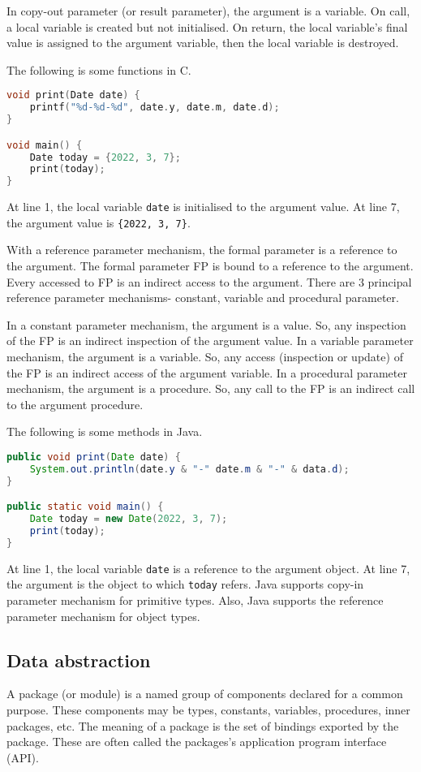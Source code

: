\documentclass[a4paper, openany]{memoir}
\begin{document}
In copy-out parameter (or result parameter), the argument is a variable. On call, a local variable is created but not initialised. On return, the local variable's final value is assigned to the argument variable, then the local variable is destroyed.

The following is some functions in C.
\begin{lstlisting}[language=C]
void print(Date date) {
    printf("%d-%d-%d", date.y, date.m, date.d);
}

void main() {
    Date today = {2022, 3, 7};
    print(today);
}
\end{lstlisting}
At line 1, the local variable \texttt{date} is initialised to the argument value. At line 7, the argument value is \texttt{\{2022, 3, 7\}}.

With a reference parameter mechanism, the formal parameter is a reference to the argument. The formal parameter FP is bound to a reference to the argument. Every accessed to FP is an indirect access to the argument. There are 3 principal reference parameter mechanisms- constant, variable and procedural parameter.

In a constant parameter mechanism, the argument is a value. So, any inspection of the FP is an indirect inspection of the argument value. In a variable parameter mechanism, the argument is a variable. So, any access (inspection or update) of the FP is an indirect access of the argument variable. In a procedural parameter mechanism, the argument is a procedure. So, any call to the FP is an indirect call to the argument procedure.

The following is some methods in Java.
\begin{lstlisting}[language=Java]
public void print(Date date) {
    System.out.println(date.y & "-" date.m & "-" & data.d);
}

public static void main() {
    Date today = new Date(2022, 3, 7);
    print(today);
}
\end{lstlisting}
At line 1, the local variable \texttt{date} is a reference to the argument object. At line 7, the argument is the object to which \texttt{today} refers. Java supports copy-in parameter mechanism for primitive types. Also, Java supports the reference parameter mechanism for object types.

\subsection{Data abstraction}
A package (or module) is a named group of components declared for a common purpose. These components may be types, constants, variables, procedures, inner packages, etc. The meaning of a package is the set of bindings exported by the package. These are often called the packages's application program interface (API).
\end{document}
